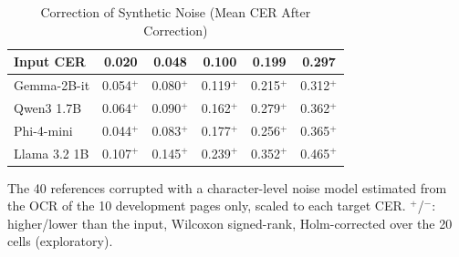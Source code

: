 \begin{table}[t]
\centering
\caption{Correction of Synthetic Noise (Mean CER After Correction)}
\label{tab:noise}
\setlength{\tabcolsep}{4pt}
\footnotesize
\begin{tabular}{lccccc}
\toprule
Input CER & 0.020 & 0.048 & 0.100 & 0.199 & 0.297 \\
\midrule
Gemma-2B-it & 0.054$^{+}$ & 0.080$^{+}$ & 0.119$^{+}$ & 0.215$^{+}$ & 0.312$^{+}$ \\
Qwen3 1.7B & 0.064$^{+}$ & 0.090$^{+}$ & 0.162$^{+}$ & 0.279$^{+}$ & 0.362$^{+}$ \\
Phi-4-mini & 0.044$^{+}$ & 0.083$^{+}$ & 0.177$^{+}$ & 0.256$^{+}$ & 0.365$^{+}$ \\
Llama 3.2 1B & 0.107$^{+}$ & 0.145$^{+}$ & 0.239$^{+}$ & 0.352$^{+}$ & 0.465$^{+}$ \\
\bottomrule
\end{tabular}
\par\smallskip
\begin{minipage}{\linewidth}\footnotesize The 40 references corrupted with a character-level noise model estimated from the OCR of the 10 development pages only, scaled to each target CER. $^{+}$/$^{-}$: higher/lower than the input, Wilcoxon signed-rank, Holm-corrected over the 20 cells (exploratory).\end{minipage}
\end{table}
